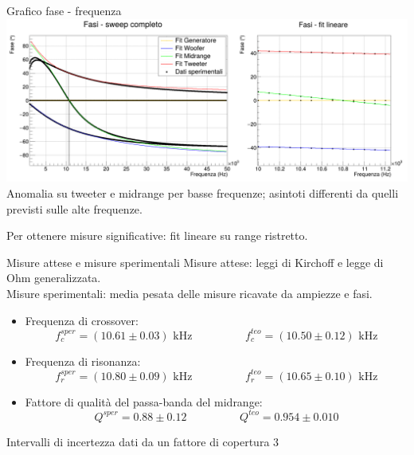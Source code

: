 \documentclass[italian]{beamer}
\begin{document}
\begin{frame}{Grafico fase - frequenza}
    \includegraphics[width=\textwidth]{fig_fase.png}
    Anomalia su tweeter e midrange per basse frequenze; asintoti differenti da quelli previsti sulle alte frequenze.

    Per ottenere misure significative: fit lineare su range ristretto.
\end{frame}

\begin{frame}{Misure attese e misure sperimentali}
    Misure attese: leggi di Kirchoff e legge di Ohm generalizzata.\\
    Misure sperimentali: media pesata delle misure ricavate da ampiezze e fasi.

    \begin{itemize}
        \item Frequenza di crossover:
              \begin{equation*}
                  f_{c}^{sper} = (10.61 \pm 0.03) \text{ kHz} \hspace{2cm} f_{c}^{teo} = (10.50
                  \pm 0.12) \text{ kHz}
              \end{equation*}
        \item Frequenza di risonanza:
              \begin{equation*}
                  f_{r}^{sper} = (10.80 \pm 0.09) \text{ kHz} \hspace{2cm} f_{r}^{teo} = (10.65
                  \pm 0.10) \text{ kHz}
              \end{equation*}
        \item Fattore di qualità del passa-banda del midrange:
              \begin{equation*}
                  Q^{sper} = 0.88 \pm 0.12  \hspace{2cm}  Q^{teo} = 0.954 \pm 0.010
              \end{equation*}
    \end{itemize}
    Intervalli di incertezza dati da un fattore di copertura $3$
\end{frame}
\end{document}
